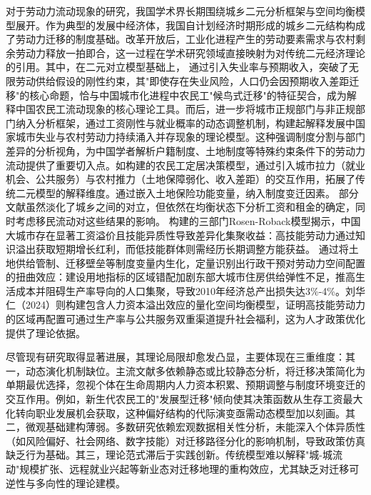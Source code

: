 \documentclass[a4paper,12pt,oneside]{book} %
\begin{document}
对于劳动力流动现象的研究，我国学术界长期围绕城乡二元分析框架与空间均衡模型展开。作为典型的发展中经济体，我国自计划经济时期形成的城乡二元结构构成了劳动力迁移的制度基础。改革开放后，工业化进程产生的劳动要素需求与农村剩余劳动力释放一拍即合，这一过程在学术研究领域直接映射为对传统二元经济理论的引用。其中，在\cite{lewisEconomicDevelopmentUnlimited1954}二元对立模型基础上，
\cite{todaroModelLaborMigration1969}通过引入失业率与预期收入，突破了无限劳动供给假设的刚性约束，其"即使存在失业风险，人口仍会因预期收入差距迁移"的核心命题，恰与中国城市化进程中农民工"候鸟式迁移"的特征契合，成为解释中国农民工流动现象的核心理论工具。而后，\cite{harrisMigrationUnemploymentDevelopment1970}进一步将城市正规部门与非正规部门纳入分析框架，通过工资刚性与就业概率的动态调整机制，构建起解释发展中国家城市失业与农村劳动力持续涌入并存现象的理论模型。这种强调制度分割与部门差异的分析视角，为中国学者解析户籍制度、土地制度等特殊约束条件下的劳动力流动提供了重要切入点。如\cite{XiongCaiYunNongMinGongChengShiDingJuZhuanYiJueCeYinSuDeTuiLaMoXingJiShiZhengFenXi2007}构建的农民工定居决策模型，通过引入城市拉力（就业机会、公共服务）与农村推力（土地保障弱化、收入差距）的交互作用，拓展了传统二元模型的解释维度。\cite{HuangZhongHuaNongCunTuDiZhiDuAnPaiShiFouZuAiNongMinGongShiMinHuaTuoDaLuoMoXingTuoZhanHeYiWuShiShiZhengFenXi2014}通过嵌入土地保险功能变量，\cite{ZhongShuiYingXiangChengRenKouLiuDongDeLiLunJieShiNongCunRenKouTuiChuShiJiaoTuoDaLuoMoXingDeZaiXiuZheng2015}纳入制度变迁因素。
部分文献虽然淡化了城乡之间的对立，但依然在均衡状态下分析工资和租金的确定，同时考虑移民流动对这些结果的影响。
\cite{ZongJiaFengDaChengShiZhiFuLiaoGengGaoDeGongZiMa2015}构建的三部门Rosen-Roback模型揭示，中国大城市存在显著工资溢价且技能异质性导致差异化集聚收益：高技能劳动力通过知识溢出获取短期增长红利，而低技能群体则需经历长期调整方能获益。
\cite{WangLiLiWoGuoRenKouQianYiChengBenChengShiGuiMoYuShengChanLu2020,WangLiLiTuDiGongGeiFangJieYuLaoDongLiKongJianPeiZhiXiaoLu2023,WangLiLiLaoDongLiLiuDongDuiChengShiGongZiYuFuLiDeYingXiangJiYuKongJianJunHengMoXingDeFenXi2024}通过将土地供给管制、迁移壁垒等制度变量内生化，定量识别出行政干预对劳动力空间配置的扭曲效应：建设用地指标的区域错配加剧东部大城市住房供给弹性不足，推高生活成本并阻碍生产率导向的人口集聚，导致2010年经济总产出损失达3\%-4\%。刘华仁（2024）则构建包含人力资本溢出效应的量化空间均衡模型，证明高技能劳动力的区域再配置可通过生产率与公共服务双重渠道提升社会福利，这为人才政策优化提供了理论依据。

尽管现有研究取得显著进展，其理论局限却愈发凸显，主要体现在三重维度：其一，动态演化机制缺位。主流文献多依赖静态或比较静态分析，将迁移决策简化为单期最优选择，忽视个体在生命周期内人力资本积累、预期调整与制度环境变迁的交互作用。例如，新生代农民工的"发展型迁移"倾向使其决策函数从生存工资最大化转向职业发展机会获取，这种偏好结构的代际演变亟需动态模型加以刻画。其二，微观基础建构薄弱。多数研究依赖宏观数据相关性分析，未能深入个体异质性（如风险偏好、社会网络、数字技能）对迁移路径分化的影响机制，导致政策仿真缺乏行为基础。其三，理论范式滞后于实践创新。传统模型难以解释"城-城流动"规模扩张、远程就业兴起等新业态对迁移地理的重构效应，尤其缺乏对迁移可逆性与多向性的理论建模。
\end{document}
